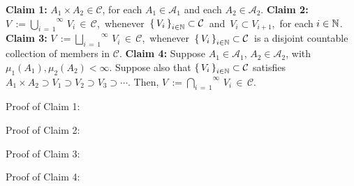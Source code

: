 \begin{center}
\begin{minipage}{6.5in}
\noindent
\textbf{Claim 1:}\quad
$A_{1} \times A_{2} \in \mathcal{C}$, for each $A_{1}\in\mathcal{A}_{1}$ and each $A_{2}\in\mathcal{A}_{2}$.
\vskip 0.5cm
\noindent
\textbf{Claim 2:}\quad
$V \,:= \overset{\infty}{\underset{i\,=\,1}{\bigcup}}\,V_{i}\,\in\,\mathcal{C}$,\,
whenever
\,$\left\{\,V_{i}\,\right\}_{i\in\mathbb{N}} \subset \mathcal{C}$\, and \,$V_{i} \subset V_{i+1}$,\, for each $i\in\mathbb{N}$.
\vskip 0.5cm
\noindent
\textbf{Claim 3:}\quad
$V \,:= \overset{\infty}{\underset{i\,=\,1}{\bigsqcup}}\,V_{i}\,\in\,\mathcal{C}$,\,
whenever
\,$\left\{\,V_{i}\,\right\}_{i\in\mathbb{N}} \subset \mathcal{C}$\,
is a disjoint countable collection of members in $\mathcal{C}$.
\vskip 0.5cm
\noindent
\textbf{Claim 4:}\quad
Suppose $A_{1}\in\mathcal{A}_{1}$, $A_{2}\in\mathcal{A}_{2}$, with $\mu_{1}(A_{1}), \mu_{2}(A_{2}) < \infty$.
Suppose also that
$\left\{\,V_{i}\,\right\}_{i\in\mathbb{N}} \subset \mathcal{C}$ satisfies
$A_{1}\times A_{2} \supset V_{1} \supset V_{2} \supset V_{3} \supset \cdots$.
Then, $V \,:= \overset{\infty}{\underset{i\,=\,1}{\bigcap}}\,V_{i}\,\in\,\mathcal{C}$.
\end{minipage}
\end{center}

\vskip 0.5cm
\noindent
Proof of Claim 1:\quad

\vskip 0.5cm
\noindent
Proof of Claim 2:\quad

\vskip 0.5cm
\noindent
Proof of Claim 3:\quad

\vskip 0.5cm
\noindent
Proof of Claim 4:\quad

